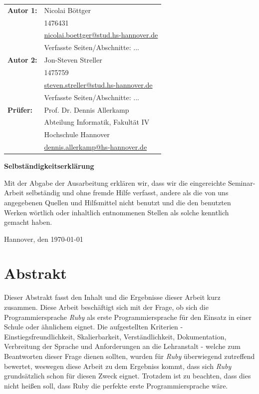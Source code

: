 \documentclass[12pt,DIV=14, version=first, BCOR=10mm,a4paper,twoside,parskip=half-,headsepline,headinclude]{scrartcl}
\begin{document}
  \newpage \thispagestyle{empty}
 \begin{tabular}{ll}
{\bfseries\sffamily Autor 1:} &  Nicolai Böttger \\
            & 1476431 \\
            & \href{mailto:nicolai.boettger@stud.hs-hannover.de}{nicolai.boettger@stud.hs-hannover.de} \\
            & Verfasste Seiten/Abschnitte: ...
            \\[5ex]
{\bfseries\sffamily Autor 2:} & Jon-Steven Streller \\
            & 1475759 \\
            & \href{mailto:steven.streller@stud.hs-hannover.de}{steven.streller@stud.hs-hannover.de} \\
           & Verfasste Seiten/Abschnitte: ... \\[5ex]
 {\bfseries\sffamily Prüfer:} &Prof. Dr. Dennis Allerkamp \\
          & Abteilung Informatik, Fakultät IV \\
         & Hochschule Hannover \\
        & \href{mailto:dennis.allerkamp@hs-hannover.de}{dennis.allerkamp@hs-hannover.de}
\end{tabular}

\vfill

\begin{center} \sffamily\bfseries Selbständigkeitserklärung \end{center}

Mit der Abgabe der Ausarbeitung erklären wir, dass wir die eingereichte Seminar-Arbeit
selbständig und ohne fremde Hilfe verfasst, andere als die von uns angegebenen Quellen
und Hilfsmittel nicht benutzt und die den benutzten Werken wörtlich oder
inhaltlich entnommenen Stellen als solche kenntlich gemacht haben.
\vspace*{7ex}

Hannover, den \today \hfill

\pagebreak
\section{Abstrakt}
\begin{flushleft}
Dieser Abstrakt fasst den Inhalt und die Ergebnisse dieser Arbeit kurz zusammen. Diese Arbeit beschäftigt sich mit der Frage, ob sich die Programmiersprache \textit{\glqq Ruby\grqq} als erste Programmiersprache für den Einsatz in einer Schule oder ähnlichem eignet. Die aufgestellten Kriterien - Einstiegsfreundlichkeit, Skalierbarkeit, Verständlichkeit, Dokumentation, Verbreitung der Sprache und Anforderungen an die Lehranstalt - welche zum Beantworten dieser Frage dienen sollten, wurden für \textit{\glqq Ruby\grqq} überwiegend zutreffend bewertet, weswegen diese Arbeit zu dem Ergebniss kommt, dass sich \textit{\glqq Ruby\grqq} grundsätzlich schon für diesen Zweck eignet. Trotzdem ist zu beachten, dass dies nicht heißen soll, dass Ruby die perfekte erste Programmiersprache wäre.
\end{flushleft}
  \tableofcontents  %
\end{document}

